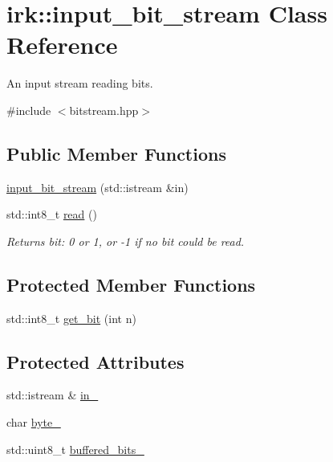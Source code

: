 \hypertarget{classirk_1_1input__bit__stream}{}\section{irk\+:\+:input\+\_\+bit\+\_\+stream Class Reference}
\label{classirk_1_1input__bit__stream}


An input stream reading bits.  




{\ttfamily \#include $<$bitstream.\+hpp$>$}

\subsection*{Public Member Functions}
\begin{DoxyCompactItemize}
\item 
\mbox{\hyperlink{classirk_1_1input__bit__stream_a9265f80a24bee081fdade3d7950f4c12}{input\+\_\+bit\+\_\+stream}} (std\+::istream \&in)
\item 
std\+::int8\+\_\+t \mbox{\hyperlink{classirk_1_1input__bit__stream_a5d0df3f69ce0887e5f93fc15a59f9b96}{read}} ()
\begin{DoxyCompactList}\small\item\em Returns bit\+: 0 or 1, or -\/1 if no bit could be read. \end{DoxyCompactList}\end{DoxyCompactItemize}
\subsection*{Protected Member Functions}
\begin{DoxyCompactItemize}
\item 
std\+::int8\+\_\+t \mbox{\hyperlink{classirk_1_1input__bit__stream_a5a318b047d8ba7046dc69c5d608f7343}{get\+\_\+bit}} (int n)
\end{DoxyCompactItemize}
\subsection*{Protected Attributes}
\begin{DoxyCompactItemize}
\item 
std\+::istream \& \mbox{\hyperlink{classirk_1_1input__bit__stream_a3513799a1ea6025e9e6fc2c83a530b6a}{in\+\_\+}}
\item 
char \mbox{\hyperlink{classirk_1_1input__bit__stream_ac150fc2255ded1f76ddd5a25f5c4f5ba}{byte\+\_\+}}
\item 
std\+::uint8\+\_\+t \mbox{\hyperlink{classirk_1_1input__bit__stream_a591955c1b7182333b87e9e41b8d7cad7}{buffered\+\_\+bits\+\_\+}}
\end{DoxyCompactItemize}


